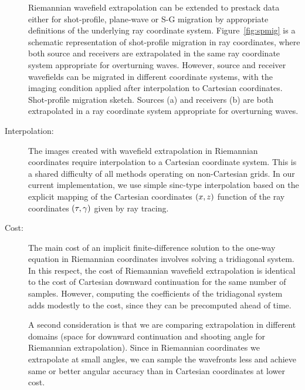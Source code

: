 \begin{description}
Riemannian wavefield extrapolation can be extended
to prestack data either for shot-profile, plane-wave or 
S-G migration by appropriate definitions of the 
underlying ray coordinate system.
Figure~\ref{fig:spmig} is a schematic representation of 
shot-profile migration in ray coordinates, 
where both source and receivers
are extrapolated in the same ray coordinate system
appropriate for overturning waves.
However, source and receiver wavefields
can be migrated in different coordinate systems,
with the imaging condition applied after interpolation to 
Cartesian coordinates. 
{Shot-profile migration sketch.
Sources (a) and receivers (b) are both extrapolated in
a ray coordinate system appropriate for 
overturning waves.
}
\item[Interpolation:]
The images created with wavefield extrapolation in Riemannian
coordinates require interpolation to a Cartesian coordinate 
system. This is a shared difficulty of all methods 
operating on non-Cartesian grids. In our current implementation, 
we use simple sinc-type interpolation based on the
explicit mapping of the Cartesian coordinates $(x,z)$
function of the ray coordinates $(\tau,\gamma)$ given by ray tracing.
\item[Cost:]
The main cost of an implicit finite-difference solution to the 
one-way equation in Riemannian coordinates involves solving a
tridiagonal system. In this respect, the cost of Riemannian
wavefield extrapolation is identical to the cost of Cartesian
downward continuation for the same number of samples.
However, computing the coefficients of the tridiagonal 
system adds modestly to the cost, since they can be 
precomputed ahead of time.
\par
A second consideration is that
    we are comparing extrapolation 
    in different domains (space for downward continuation
    and shooting angle for Riemannian extrapolation). 
    Since in Riemannian coordinates
    we extrapolate at small angles, we can
    sample the wavefronts less and achieve same or better
    angular accuracy than in Cartesian coordinates at lower
    cost.
\end{description}







